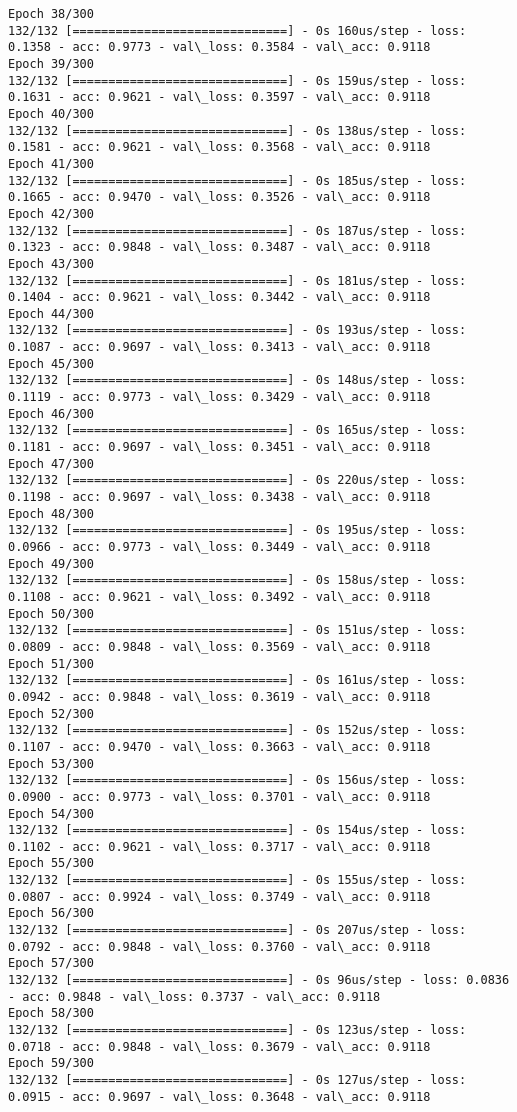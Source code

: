 \documentclass[11pt]{article}
\begin{document}
\begin{Verbatim}[commandchars=\\\{\}]
Epoch 38/300
132/132 [==============================] - 0s 160us/step - loss: 0.1358 - acc: 0.9773 - val\_loss: 0.3584 - val\_acc: 0.9118
Epoch 39/300
132/132 [==============================] - 0s 159us/step - loss: 0.1631 - acc: 0.9621 - val\_loss: 0.3597 - val\_acc: 0.9118
Epoch 40/300
132/132 [==============================] - 0s 138us/step - loss: 0.1581 - acc: 0.9621 - val\_loss: 0.3568 - val\_acc: 0.9118
Epoch 41/300
132/132 [==============================] - 0s 185us/step - loss: 0.1665 - acc: 0.9470 - val\_loss: 0.3526 - val\_acc: 0.9118
Epoch 42/300
132/132 [==============================] - 0s 187us/step - loss: 0.1323 - acc: 0.9848 - val\_loss: 0.3487 - val\_acc: 0.9118
Epoch 43/300
132/132 [==============================] - 0s 181us/step - loss: 0.1404 - acc: 0.9621 - val\_loss: 0.3442 - val\_acc: 0.9118
Epoch 44/300
132/132 [==============================] - 0s 193us/step - loss: 0.1087 - acc: 0.9697 - val\_loss: 0.3413 - val\_acc: 0.9118
Epoch 45/300
132/132 [==============================] - 0s 148us/step - loss: 0.1119 - acc: 0.9773 - val\_loss: 0.3429 - val\_acc: 0.9118
Epoch 46/300
132/132 [==============================] - 0s 165us/step - loss: 0.1181 - acc: 0.9697 - val\_loss: 0.3451 - val\_acc: 0.9118
Epoch 47/300
132/132 [==============================] - 0s 220us/step - loss: 0.1198 - acc: 0.9697 - val\_loss: 0.3438 - val\_acc: 0.9118
Epoch 48/300
132/132 [==============================] - 0s 195us/step - loss: 0.0966 - acc: 0.9773 - val\_loss: 0.3449 - val\_acc: 0.9118
Epoch 49/300
132/132 [==============================] - 0s 158us/step - loss: 0.1108 - acc: 0.9621 - val\_loss: 0.3492 - val\_acc: 0.9118
Epoch 50/300
132/132 [==============================] - 0s 151us/step - loss: 0.0809 - acc: 0.9848 - val\_loss: 0.3569 - val\_acc: 0.9118
Epoch 51/300
132/132 [==============================] - 0s 161us/step - loss: 0.0942 - acc: 0.9848 - val\_loss: 0.3619 - val\_acc: 0.9118
Epoch 52/300
132/132 [==============================] - 0s 152us/step - loss: 0.1107 - acc: 0.9470 - val\_loss: 0.3663 - val\_acc: 0.9118
Epoch 53/300
132/132 [==============================] - 0s 156us/step - loss: 0.0900 - acc: 0.9773 - val\_loss: 0.3701 - val\_acc: 0.9118
Epoch 54/300
132/132 [==============================] - 0s 154us/step - loss: 0.1102 - acc: 0.9621 - val\_loss: 0.3717 - val\_acc: 0.9118
Epoch 55/300
132/132 [==============================] - 0s 155us/step - loss: 0.0807 - acc: 0.9924 - val\_loss: 0.3749 - val\_acc: 0.9118
Epoch 56/300
132/132 [==============================] - 0s 207us/step - loss: 0.0792 - acc: 0.9848 - val\_loss: 0.3760 - val\_acc: 0.9118
Epoch 57/300
132/132 [==============================] - 0s 96us/step - loss: 0.0836 - acc: 0.9848 - val\_loss: 0.3737 - val\_acc: 0.9118
Epoch 58/300
132/132 [==============================] - 0s 123us/step - loss: 0.0718 - acc: 0.9848 - val\_loss: 0.3679 - val\_acc: 0.9118
Epoch 59/300
132/132 [==============================] - 0s 127us/step - loss: 0.0915 - acc: 0.9697 - val\_loss: 0.3648 - val\_acc: 0.9118

    \end{Verbatim}
\end{document}
